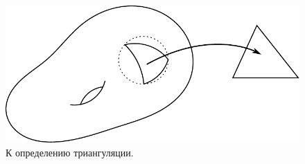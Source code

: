 \begin{figure}[htbp]
    \centering
    \includegraphics[scale=1]{images/c10.1.pdf}
    \caption{К определению триангуляции.}
    \label{fig:c10.1}
\end{figure}

